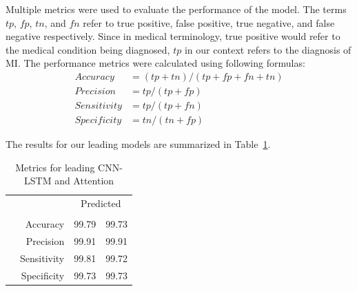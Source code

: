 \documentclass{ieeeaccess}
\begin{document}
Multiple metrics were used to evaluate the performance of the model. The terms $tp$, $fp$, $tn$, and $fn$ refer to true positive, false positive, true negative, and false negative respectively. Since in medical terminology, true positive would refer to the medical condition being diagnosed, $tp$ in our context refers to the diagnosis of MI. The performance metrics were calculated using following formulas:
\begin{align*} 
Accuracy    &=(tp + tn)/(tp + fp + fn + tn)   \\
Precision   &=tp/(tp + fp)                   \\
Sensitivity &=tp/(tp + fn)               \\
Specificity &=tn/(tn + fp)    
\end{align*}

 
The results for our leading models are summarized in Table~\ref{tbl:kpis}.
\begin{table}[!ht]
\caption{Metrics for leading CNN-LSTM and Attention}
\label{tbl:kpis}
\centering
\scriptsize
{%
	\renewcommand{\arraystretch}{1.5}
	\begin{tabular}{cr|r r}
		\multicolumn{2}{c|}{}
		&   \multicolumn{2}{c}{Predicted}\\
		&	&\multicolumn{1}{c}{\rotatebox{90}{CNN-LSTM}} &\multicolumn{1}{c}{\rotatebox{90}{ ATTENTION}}\\
		\cline{2-4}
		\multirow{2}{*}{\rotatebox[origin=c]{90}{Actual}}
		& Accuracy 	    &99.79	    &	99.73\\	
		& Precision 	&99.91	    &	99.91\\	
		& Sensitivity 	&99.81	    &	99.72\\	
		& Specificity 	&99.73	    &	99.73\\	
	\end{tabular}
\medskip	
}
\end{table}
\end{document}

